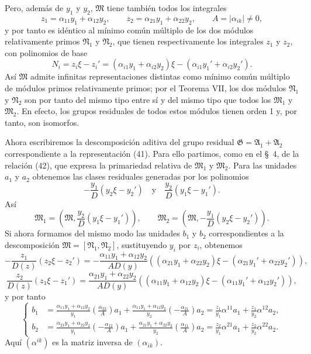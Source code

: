 \documentclass[11pt]{article}
\begin{document}
Pero, además de $y_1$ y $y_2$, $\mathfrak M$ tiene también todos los integrales
\[
 z_1=\alpha_{11}y_1+\alpha_{12}y_2,
 \qquad
 z_2=\alpha_{21}y_1+\alpha_{22}y_2,
 \qquad
 A=|\alpha_{ik}|\ne0,
\]
y por tanto es idéntico al mínimo común múltiplo de los dos módulos relativamente primos $\mathfrak N_1$ y $\mathfrak N_2$, que tienen respectivamente los integrales $z_1$ y $z_2$, con polinomios de base
\[
 N_i=z_i\xi-z_i'=(\alpha_{i1}y_1+\alpha_{i2}y_2)\xi-(\alpha_{i1}y_1'+\alpha_{i2}y_2').
\]
Así $\mathfrak M$ admite infinitas representaciones distintas como mínimo común múltiplo de módulos primos relativamente primos; por el Teorema VII, los dos módulos $\mathfrak N_1$ y $\mathfrak N_2$ son por tanto del mismo tipo entre sí y del mismo tipo que todos los $\mathfrak M_1$ y $\mathfrak M_2$. En efecto, los grupos residuales de todos estos módulos tienen orden 1 y, por tanto, son isomorfos.

Ahora escribiremos la descomposición aditiva del grupo residual $\mathfrak G=\mathfrak A_1+\mathfrak A_2$ correspondiente a la representación (41). Para ello partimos, como en el \S~4, de la relación (42), que expresa la primariedad relativa de $\mathfrak M_1$ y $\mathfrak M_2$. Para las unidades $a_1$ y $a_2$ obtenemos las clases residuales generadas por los polinomios
\[
 -\frac{y_1}{D}(y_2\xi-y_2')
 \quad\text{y}\quad
 \frac{y_2}{D}(y_1\xi-y_1').
\]
Así
\[
 \mathfrak M_1=\left(\mathfrak M,\frac{y_2}{D}(y_1\xi-y_1')\right),
 \qquad
 \mathfrak M_2=\left(\mathfrak M,-\frac{y_1}{D}(y_2\xi-y_2')\right).
\]
Si ahora formamos del mismo modo las unidades $b_1$ y $b_2$ correspondientes a la descomposición $\mathfrak M=[\mathfrak N_1,\mathfrak N_2]$, sustituyendo $y_i$ por $z_i$, obtenemos
\[
 -\frac{z_1}{D(z)}(z_2\xi-z_2')
 =-\frac{\alpha_{11}y_1+\alpha_{12}y_2}{AD(y)}
 ((\alpha_{21}y_1+\alpha_{22}y_2)\xi-(\alpha_{21}y_1'+\alpha_{22}y_2')),
\]
\[
 \frac{z_2}{D(z)}(z_1\xi-z_1')
 =\frac{\alpha_{21}y_1+\alpha_{22}y_2}{AD(y)}
 ((\alpha_{11}y_1+\alpha_{12}y_2)\xi-(\alpha_{11}y_1'+\alpha_{12}y_2')),
\]
y por tanto
\begin{equation}
\left\{
\begin{aligned}
 b_1&=\frac{\alpha_{11}y_1+\alpha_{12}y_2}{y_1}
 \left(\frac{\alpha_{22}}{A}\right)a_1
 +\frac{\alpha_{11}y_1+\alpha_{12}y_2}{y_2}
 \left(-\frac{\alpha_{21}}{A}\right)a_2
 =\frac{z_1}{y_1}\alpha^{11}a_1+\frac{z_1}{y_2}\alpha^{12}a_2,\\
 b_2&=\frac{\alpha_{21}y_1+\alpha_{22}y_2}{y_1}
 \left(-\frac{\alpha_{12}}{A}\right)a_1
 +\frac{\alpha_{21}y_1+\alpha_{22}y_2}{y_2}
 \left(\frac{\alpha_{11}}{A}\right)a_2
 =\frac{z_2}{y_1}\alpha^{21}a_1+\frac{z_2}{y_2}\alpha^{22}a_2.
\end{aligned}\right.
\tag{43}
\end{equation}
Aquí $(\alpha^{ik})$ es la matriz inversa de $(\alpha_{ik})$.
\end{document}
